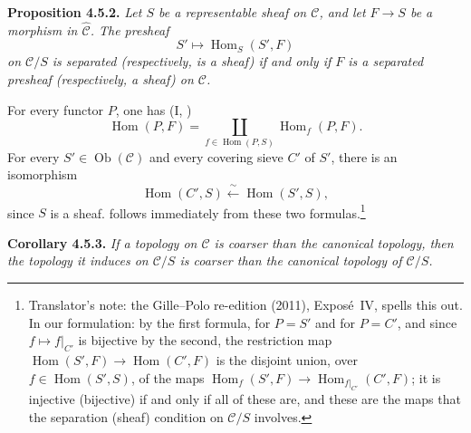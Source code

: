 
\medskip
\noindent{}\textbf{Proposition 4.5.2.}
\textit{Let \(S\) be a representable sheaf on \(\mathscr C\), and let
\(F\to S\) be a morphism in \(\widehat{\mathscr C}\). The presheaf
\[
  S'\longmapsto \operatorname{Hom}_{S}(S',F)
\]
on \(\mathscr C/S\) is separated (respectively, is a sheaf) if and only if
\(F\) is a separated presheaf (respectively, a sheaf) on \(\mathscr C\).}

For every functor \(P\), one has (I, )
\[
  \operatorname{Hom}(P,F)
  =\coprod_{f\in\operatorname{Hom}(P,S)}
    \operatorname{Hom}_{f}(P,F).
\]
For every \(S'\in\operatorname{Ob}(\mathscr C)\) and every covering sieve
\(C'\) of \(S'\), there is an isomorphism
\[
  \operatorname{Hom}(C',S)\xleftarrow{\ \sim\ }\operatorname{Hom}(S',S),
\]
since \(S\) is a sheaf.  follows immediately from these two
formulas.\footnote{Translator's note: the Gille--Polo re-edition (2011), Expos\'e~IV, spells
this out. In our formulation: by the first formula, for \(P=S'\) and for
\(P=C'\), and since \(f\mapsto f|_{C'}\) is bijective by the second, the
restriction map \(\operatorname{Hom}(S',F)\to\operatorname{Hom}(C',F)\) is the
disjoint union, over \(f\in\operatorname{Hom}(S',S)\), of the maps
\(\operatorname{Hom}_f(S',F)\to\operatorname{Hom}_{f|_{C'}}(C',F)\); it is
injective (bijective) if and only if all of these are, and these are the maps
that the separation (sheaf) condition on \(\mathscr C/S\) involves.}

\medskip
\noindent{}\textbf{Corollary 4.5.3.}
\textit{If a topology on \(\mathscr C\) is coarser than the canonical
topology, then the topology it induces on \(\mathscr C/S\) is coarser than
the canonical topology of \(\mathscr C/S\).}
